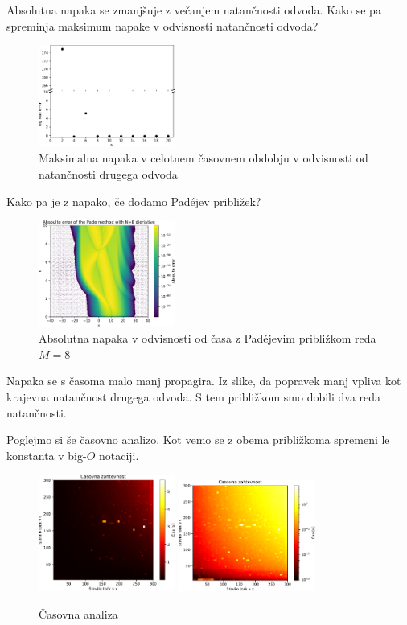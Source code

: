 Absolutna napaka se zmanjšuje z večanjem natančnosti odvoda.
Kako se pa spreminja maksimum napake v odvisnosti natančnosti odvoda?
\newpage
\begin{figure}[h]
    \begin{center}
    \includegraphics[width=0.4\textwidth]{pdf/max_error.pdf}
    \end{center}
    \caption{Maksimalna napaka v celotnem časovnem obdobju v odvisnosti od natančnosti drugega odvoda}
\end{figure}

Kako pa je z napako, če dodamo Padéjev približek?
\begin{figure}[h]
    \centering
    \includegraphics[width=0.4\textwidth]{pdf/abs_error_pade.pdf}
    \caption{Absolutna napaka v odvisnosti od časa z Padéjevim približkom reda $M=8$}
\end{figure}
Napaka se s časoma malo manj propagira. Iz slike, da popravek manj vpliva kot krajevna natančnost drugega odvoda.
S tem približkom smo dobili dva reda natančnosti.
\newpage

Poglejmo si še časovno analizo. Kot vemo se z obema približkoma spremeni le konstanta v big-$O$ notaciji.
\begin{figure}[h]
    \centering
    \includegraphics[width=0.4\textwidth]{pdf/time.pdf}
    \includegraphics[width=0.4\textwidth]{pdf/time_log.pdf}
    \caption{Časovna analiza}
\end{figure}

